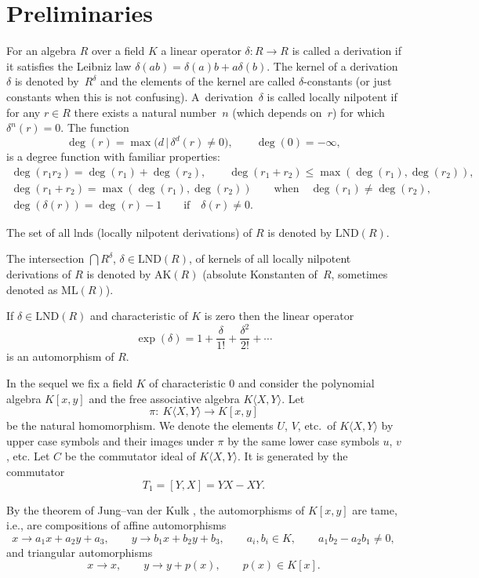 \documentclass[11pt]{article}
\numberwithin{equation}{section}
\begin{document}
\section{Preliminaries}\label{section2}

For an algebra $R$ over a field $K$ a linear operator $\delta\colon R\rightarrow R$ is called a derivation if it satisfies the Leibniz law $\delta(ab) = \delta(a)b + a\delta(b)$.
The kernel of a derivation $\delta$ is denoted by~$R^{\delta}$ and the elements of the kernel are called $\delta$-constants (or just constants when this is not confusing).
A~derivation~$\delta$ is called locally nilpotent if for any $r \in R$ there exists a natural number~$n$ (which depends on~$r$) for which $\delta^n(r) = 0$. The function
\[
\deg(r) = \max\big(d\,|\, \delta^d(r) \neq 0\big), \qquad \deg(0) = -\infty,
\]
is a degree function with familiar properties:
\begin{gather*}
\deg(r_1r_2) = \deg(r_1) + \deg(r_2),\qquad \deg(r_1 + r_2) \leq \max(\deg(r_1), \deg(r_2)),\\
\deg(r_1 + r_2) =\max(\deg(r_1), \deg(r_2)) \qquad \text{when} \quad \deg(r_1) \neq \deg(r_2),\\
\deg(\delta(r)) = \deg(r) - 1\qquad \text{if} \quad \delta(r) \neq 0.
\end{gather*}

The set of all lnds (locally nilpotent derivations) of $R$ is denoted by $\text{LND}(R)$.

The intersection $\bigcap R^{\delta}$, $\delta \in \text{LND}(R)$, of kernels of all locally nilpotent derivations of $R$ is denoted by $\text{AK}(R)$ (absolute Konstanten of~$R$, sometimes denoted as $\text{ML}(R)$).

If $\delta \in \text{LND}(R)$ and characteristic of $K$ is zero then the linear operator
\[
\exp(\delta)=1+\frac{\delta}{1!}+\frac{\delta^2}{2!}+\cdots
\]
is an automorphism of $R$.

In the sequel we fix a field $K$ of characteristic 0 and consider the polynomial algebra $K[x,y]$ and the free associative algebra $K\langle X,Y\rangle$. Let
\[
\pi\colon \ K\langle X,Y\rangle\to K[x,y]
\]
be the natural homomorphism. We denote the elements $U$, $V$, etc.\ of $K\langle X,Y\rangle$ by upper case symbols and their images under $\pi$ by the same lower case symbols $u$, $v$, etc. Let $C$ be the commutator ideal of $K\langle X,Y\rangle$. It is generated by the commutator
\[
T_1 = [Y, X] = YX - XY.
\]

By the theorem of Jung--van der Kulk \cite{J, K}, the automorphisms of $K[x,y]$ are tame, i.e., are compositions of affine automorphisms
\[
x \rightarrow a_1 x + a_2 y + a_3, \qquad y \rightarrow b_1 x + b_2 y + b_3, \qquad a_i,b_i\in K,\qquad a_1b_2 - a_2b_1 \neq 0,
\]
and triangular automorphisms
\[
x \rightarrow x, \qquad y \rightarrow y + p(x),\qquad p(x)\in K[x].
\]
\end{document}
